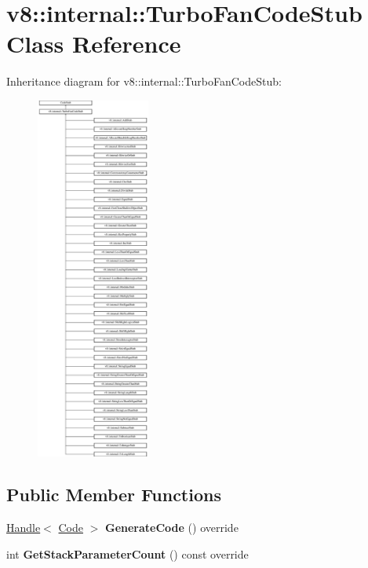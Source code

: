 \hypertarget{classv8_1_1internal_1_1_turbo_fan_code_stub}{}\section{v8\+:\+:internal\+:\+:Turbo\+Fan\+Code\+Stub Class Reference}
\label{classv8_1_1internal_1_1_turbo_fan_code_stub}
Inheritance diagram for v8\+:\+:internal\+:\+:Turbo\+Fan\+Code\+Stub\+:\begin{figure}[H]
\begin{center}
\leavevmode
\includegraphics[height=12.000000cm]{classv8_1_1internal_1_1_turbo_fan_code_stub}
\end{center}
\end{figure}
\subsection*{Public Member Functions}
\begin{DoxyCompactItemize}
\item 
\hyperlink{classv8_1_1internal_1_1_handle}{Handle}$<$ \hyperlink{classv8_1_1internal_1_1_code}{Code} $>$ {\bfseries Generate\+Code} () override\hypertarget{classv8_1_1internal_1_1_turbo_fan_code_stub_ad46169264bd619e197130313509febea}{}\label{classv8_1_1internal_1_1_turbo_fan_code_stub_ad46169264bd619e197130313509febea}

\item 
int {\bfseries Get\+Stack\+Parameter\+Count} () const  override\hypertarget{classv8_1_1internal_1_1_turbo_fan_code_stub_a5de77e4e399b82a0b20bf6d1f3533948}{}\label{classv8_1_1internal_1_1_turbo_fan_code_stub_a5de77e4e399b82a0b20bf6d1f3533948}

\end{DoxyCompactItemize}
